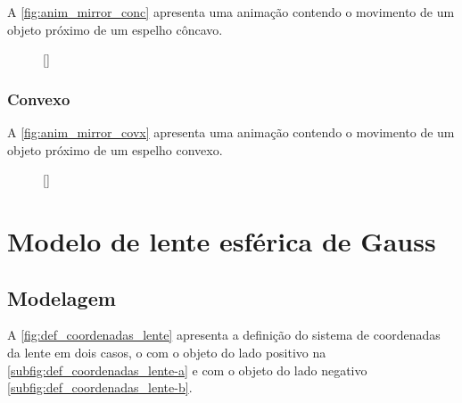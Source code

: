 \documentclass[a4paper,10pt]{article}
\begin{document}
A \autoref{fig:anim_mirror_conc} apresenta uma animação contendo o movimento de um objeto próximo de um espelho côncavo.

\begin{figure}[ht]
  \centering
  [\linewidth]{
  }
\end{figure}

\subsubsection{Convexo}

A \autoref{fig:anim_mirror_covx} apresenta uma animação contendo o movimento de um objeto próximo de um espelho convexo.

\begin{figure}[ht]
  \centering
  [\linewidth]{
  }
\end{figure}

\section{Modelo de lente esférica de Gauss}

\subsection{Modelagem}

A \autoref{fig:def_coordenadas_lente} apresenta a definição do sistema de coordenadas da lente em dois casos, o com o objeto do lado positivo na \autoref{subfig:def_coordenadas_lente-a} e com o objeto do lado negativo \autoref{subfig:def_coordenadas_lente-b}.
\end{document}
